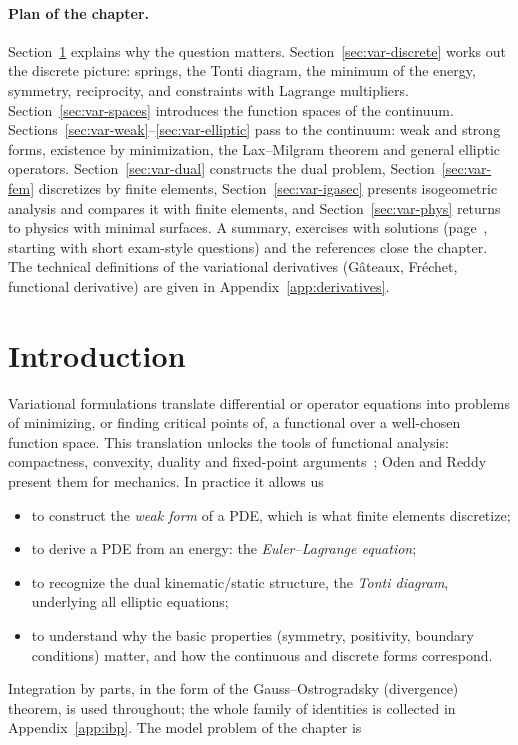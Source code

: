 \paragraph{Plan of the chapter.} Section~\ref{sec:var-intro} explains why the question
matters. Section~\ref{sec:var-discrete} works out the discrete picture:
springs, the Tonti diagram, the minimum of the energy, symmetry,
reciprocity, and constraints with Lagrange multipliers.
Section~\ref{sec:var-spaces} introduces the function spaces of the continuum.
Sections~\ref{sec:var-weak}--\ref{sec:var-elliptic} pass to the
continuum: weak and strong forms, existence by minimization, the
Lax--Milgram theorem and general elliptic operators.
Section~\ref{sec:var-dual} constructs the dual problem,
Section~\ref{sec:var-fem} discretizes by finite elements,
Section~\ref{sec:var-igasec} presents isogeometric analysis and compares it
with finite elements, and Section~\ref{sec:var-phys} returns to
physics with minimal surfaces. A summary, exercises with solutions
(page~\pageref{sec:var-exo}, starting with short exam-style questions) and the
references close the chapter. The technical definitions of the variational
derivatives (G\^ateaux, Fr\'echet, functional derivative) are given in
Appendix~\ref{app:derivatives}.

\section{Introduction}\label{sec:var-intro}
%
Variational formulations translate differential or operator equations into
problems of minimizing, or finding critical points of, a functional over a
well-chosen function space. This translation unlocks the tools of functional
analysis: compactness, convexity, duality and fixed-point
arguments~\cite{Evans2010,Brezis2011,Dacorogna2008}; Oden and
Reddy~\cite{OdenReddy1976} present them for mechanics. In practice it allows us
\begin{itemize}
  \item to construct the \emph{weak form} of a PDE, which is what finite
  elements discretize;
  \item to derive a PDE from an energy: the \emph{Euler--Lagrange equation};
  \item to recognize the dual kinematic/static structure, the \emph{Tonti
  diagram}, underlying all elliptic equations;
  \item to understand why the basic properties (symmetry, positivity,
  boundary conditions) matter, and how the continuous and discrete forms
  correspond.
\end{itemize}
Integration by parts, in the form of the Gauss--Ostrogradsky (divergence)
theorem, is used throughout; the whole family of identities is collected in
Appendix~\ref{app:ibp}. The model problem of the chapter is

